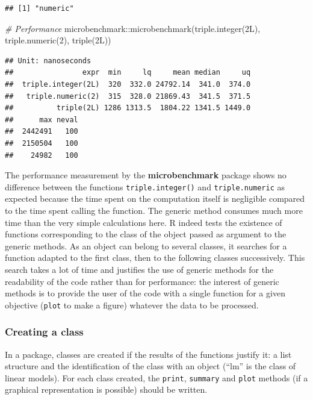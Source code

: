 \documentclass[
  12pt,
  american,
  a4paper,
  extrafontsizes,onecolumn,openright
  ]{memoir}
\newenvironment{Shaded}{\begin{snugshade}}{\end{snugshade}}
\newcommand{\CommentTok}[1]{\textcolor[rgb]{0.56,0.35,0.01}{\textit{#1}}}
\newcommand{\DecValTok}[1]{\textcolor[rgb]{0.00,0.00,0.81}{#1}}
\newcommand{\FunctionTok}[1]{\textcolor[rgb]{0.00,0.00,0.00}{#1}}
\newcommand{\NormalTok}[1]{#1}
\newcommand{\SpecialCharTok}[1]{\textcolor[rgb]{0.00,0.00,0.00}{#1}}
\newlength{\rf}
\begin{document}
\begin{verbatim}
## [1] "numeric"
\end{verbatim}

\begin{Shaded}
\begin{Highlighting}[]
\CommentTok{\# Performance}
\NormalTok{microbenchmark}\SpecialCharTok{::}\FunctionTok{microbenchmark}\NormalTok{(}\FunctionTok{triple.integer}\NormalTok{(2L), }\FunctionTok{triple.numeric}\NormalTok{(}\DecValTok{2}\NormalTok{),}
    \FunctionTok{triple}\NormalTok{(2L))}
\end{Highlighting}
\end{Shaded}

\begin{verbatim}
## Unit: nanoseconds
##                expr  min     lq     mean median     uq
##  triple.integer(2L)  320  332.0 24792.14  341.0  374.0
##   triple.numeric(2)  315  328.0 21869.43  341.5  371.5
##          triple(2L) 1286 1313.5  1804.22 1341.5 1449.0
##      max neval
##  2442491   100
##  2150504   100
##    24982   100
\end{verbatim}

\normalsize

The performance measurement by the \textbf{microbenchmark} package shows no difference between the functions \texttt{triple.integer()} and \texttt{triple.numeric} as expected because the time spent on the computation itself is negligible compared to the time spent calling the function.
The generic method consumes much more time than the very simple calculations here.
R indeed tests the existence of functions corresponding to the class of the object passed as argument to the generic methods.
As an object can belong to several classes, it searches for a function adapted to the first class, then to the following classes successively.
This search takes a lot of time and justifies the use of generic methods for the readability of the code rather than for performance: the interest of generic methods is to provide the user of the code with a single function for a given objective (\texttt{plot} to make a figure) whatever the data to be processed.

\hypertarget{creating-a-class}{%
\subsubsection{Creating a class}\label{creating-a-class}}

In a package, classes are created if the results of the functions justify it: a list structure and the identification of the class with an object (\enquote{lm} is the class of linear models).
For each class created, the \texttt{print}, \texttt{summary} and \texttt{plot} methods (if a graphical representation is possible) should be written.
\end{document}

